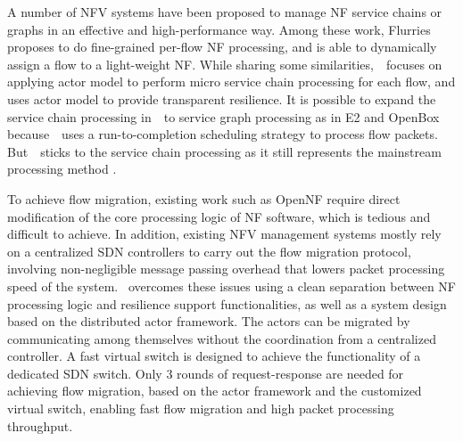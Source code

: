 A number of NFV systems \cite{palkar2015e2, OpenBox, sekar2012design, anderson2012xomb, hwang2015netvm, zhang2016opennetvm, martins2014clickos, zhang2016flurries} have been proposed to manage NF service chains or graphs in an effective and high-performance way. Among these work, Flurries \cite{zhang2016flurries} proposes to do fine-grained per-flow NF processing, and is able to dynamically assign a flow to a light-weight NF. While sharing some similarities,~\nfactor~focuses on applying actor model to perform micro service chain processing for each flow, and uses actor model to provide transparent resilience. It is possible to expand the service chain processing in~\nfactor~to service graph processing as in E2 \cite{palkar2015e2} and OpenBox \cite{OpenBox} because~\nfactor~uses a run-to-completion scheduling strategy to process flow packets. But~\nfactor~sticks to the service chain processing as it still represents the mainstream processing method \cite{hwang2015netvm, martins2014clickos}.


To achieve flow migration, existing work such as OpenNF \cite{gember2015opennf} require direct modification of the core processing logic of NF software, which is tedious and difficult to achieve. In addition, existing NFV management \cite{rajagopalan2013split} \cite{gember2015opennf} systems  mostly rely on a centralized SDN controllers to carry out the flow migration protocol, involving non-negligible message passing overhead that lowers packet processing speed of the system.
\nfactor~overcomes these issues using a clean separation between NF processing logic and resilience support functionalities, as well as a system design based on the distributed actor framework. The actors can be migrated by communicating among themselves without the coordination from a centralized controller. A fast virtual switch is designed to achieve the functionality of a dedicated SDN switch. Only 3 rounds of request-response are needed for achieving flow migration, based on the actor framework and the customized virtual switch, enabling fast flow migration and high packet processing throughput.

